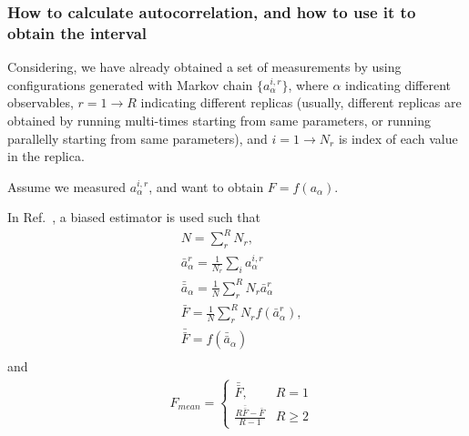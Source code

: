 \subsubsection{How to calculate autocorrelation, and how to use it to obtain the interval}

Considering, we have already obtained a set of measurements by using configurations generated with Markov chain $\{a_{\alpha}^{i,r}\}$, where $\alpha$ indicating different observables, $r=1\to R$ indicating different replicas (usually, different replicas are obtained by running multi-times starting from same parameters, or running parallelly starting from same parameters), and $i=1\to N_r$ is index of each value in the replica.

Assume we measured $a^{i,r}_{\alpha}$, and want to obtain $F=f(a_{\alpha})$.

In Ref.~\cite{autocorrelation}, a biased estimator is used such that
\begin{equation}
\begin{split}
&N=\sum _r^RN_r,\\
&\bar{a}^r_{\alpha}=\frac{1}{N_r}\sum _i a_{\alpha}^{i,r}\\
&\bar{\bar{a}}_{\alpha}=\frac{1}{N} \sum^R _r N_r \bar{a}^r_{\alpha}\\
&\bar{F}=\frac{1}{N} \sum^R _r N_rf(\bar{a}^r_{\alpha}),\\
&\bar{\bar{F}}=f(\bar{\bar{a}}_{\alpha})\\
\end{split}
\end{equation}
and
\begin{equation}
\begin{split}
&F_{mean}=\left\{\begin{array}{cc}\bar{\bar{F}}, & R=1 \\ \frac{R\bar{\bar{F}}-\bar{F}}{R-1} & R\geq 2\end{array}\right.
\end{split}
\end{equation}


